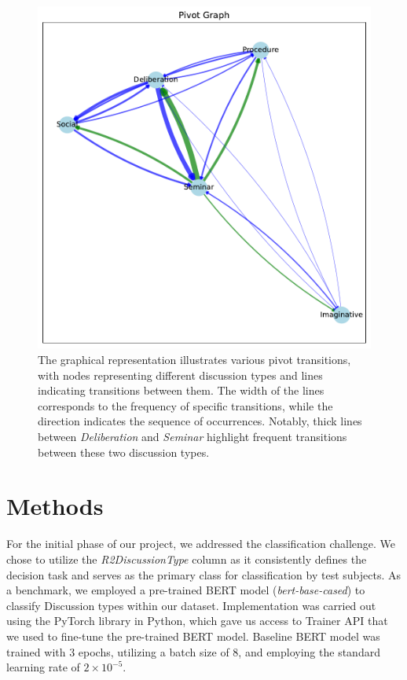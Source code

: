\documentclass[fleqn,moreauthors,10pt]{ds_report}
\begin{document}
\begin{figure}[ht!]\centering
	\includegraphics[scale=0.3]{fig/pivot_graph.pdf}
	\caption{The graphical representation illustrates various pivot transitions, with nodes representing different discussion types and lines indicating transitions between them. The width of the lines corresponds to the frequency of specific transitions, while the direction indicates the sequence of occurrences. Notably, thick lines between \textit{Deliberation} and \textit{Seminar} highlight frequent transitions between these two discussion types.}
	\label{fig:pivot_graph}
\end{figure}
\fi



\section*{Methods}

For the initial phase of our project, we addressed the classification challenge. We chose to utilize the \textit{R2DiscussionType} column as it consistently defines the decision task and serves as the primary class for classification by test subjects. As a benchmark, we employed a pre-trained BERT model (\textit{bert-base-cased}) to classify Discussion types within our dataset. Implementation was carried out using the PyTorch library in Python, which gave us access to Trainer API that we used to fine-tune the pre-trained BERT model. Baseline BERT model was trained with 3 epochs, utilizing a batch size of 8, and employing the standard learning rate of $2 \times 10^{-5}$.
\end{document}
